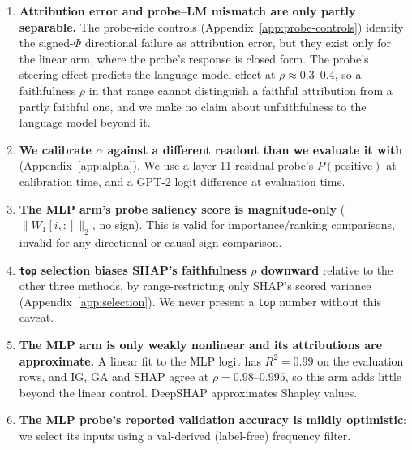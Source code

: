 \begin{enumerate}
  \item \textbf{Attribution error and probe--LM mismatch are only partly separable.} The probe-side controls (Appendix~\ref{app:probe-controls}) identify the signed-$\Phi$ directional failure as attribution error, but they exist only for the linear arm, where the probe's response is closed form. The probe's steering effect predicts the language-model effect at $\rho\approx0.3$--$0.4$, so a faithfulness $\rho$ in that range cannot distinguish a faithful attribution from a partly faithful one, and we make no claim about unfaithfulness to the language model beyond it.
  \item \textbf{We calibrate $\alpha$ against a different readout than we
  evaluate it with} (Appendix~\ref{app:alpha}). We use a layer-11 residual
  probe's $P(\text{positive})$ at calibration time, and a GPT-2 logit
  difference at evaluation time.
  \item \textbf{The MLP arm's probe saliency score is magnitude-only}
  ($\|W_1[i,:]\|_2$, no sign). This is valid for importance/ranking comparisons,
  invalid for any directional or causal-sign comparison.
  \item \textbf{\texttt{top} selection biases SHAP's faithfulness $\rho$
  downward} relative to the other three methods, by range-restricting only
  SHAP's scored variance (Appendix~\ref{app:selection}). We never present
  a \texttt{top} number without this caveat.
  \item \textbf{The MLP arm is only weakly nonlinear and its attributions are
  approximate.} A linear fit to the MLP logit has $R^2=0.99$ on the evaluation rows, and
  IG, GA and SHAP agree at $\rho=0.98$--$0.995$, so this arm adds little beyond the
  linear control. DeepSHAP approximates Shapley values.
  \item \textbf{The MLP probe's reported validation accuracy is mildly
  optimistic}: we select its inputs using a val-derived (label-free)
  frequency filter.
\end{enumerate}



